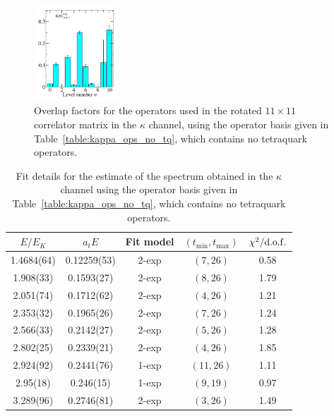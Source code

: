 \begin{figure}
  \includegraphics[width=0.28\textwidth]{figures/spectrum_a1g/no_tq/zfactors/zfactor_kaon-P000-A1g_1-TDU_5.pdf}
  \caption{Overlap factors for the operators used in the rotated $11\times 11$ correlator matrix in the $\kappa$ channel, using the operator basis given in Table~\ref{table:kappa_ops_no_tq}, which contains no tetraquark operators.}
  \label{fig:kappa_no_tq_zfactors}
\end{figure}

\begin{table}
  \centering
  \begin{tabular}{c|c|c|c|c}
    $E / E_K$ & $a_t E$ & Fit model & $(t_{\mathrm{min}}, {t_\mathrm{max}})$ & $\chi^2 / \rm{d.o.f.}$\\
    \hline
    1.4684(64)&0.12259(53)&2{-}exp&$(7, 26)$&0.58\\
1.908(33)&0.1593(27)&2{-}exp&$(8, 26)$&1.79\\%
2.051(74)&0.1712(62)&2{-}exp&$(4, 26)$&1.21\\
2.353(32)&0.1965(26)&2{-}exp&$(7, 26)$&1.24\\
2.566(33)&0.2142(27)&2{-}exp&$(5, 26)$&1.28\\
2.802(25)&0.2339(21)&2{-}exp&$(4, 26)$&1.85\\
2.924(92)&0.2441(76)&1{-}exp&$(11, 26)$&1.11\\
2.95(18)&0.246(15)&1{-}exp&$(9, 19)$&0.97\\
3.289(96)&0.2746(81)&2{-}exp&$(3, 26)$&1.49
  \end{tabular}
  \caption{Fit details for the estimate of the spectrum obtained in the $\kappa$ channel using the operator basis given in Table~\ref{table:kappa_ops_no_tq}, which contains no tetraquark operators.}
  \label{table:kappa_no_tq_spectrum}
\end{table}

